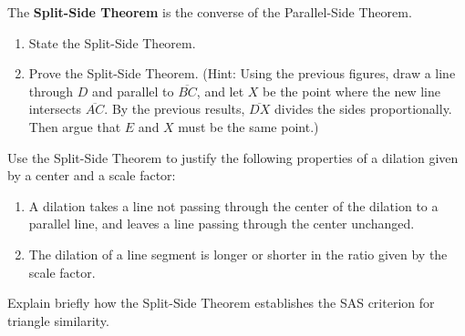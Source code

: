 \begin{prob}
The \textbf{Split-Side Theorem} is the converse of the Parallel-Side Theorem.   
\begin{enumerate}
\item State the Split-Side Theorem.   
\item Prove the Split-Side Theorem.  (Hint:  Using the previous figures, draw a line through $D$ and parallel to $\overline{BC}$, and let $X$ be the point where the new line intersects $\overline{AC}$.  By the previous results, $\overline{DX}$ divides the sides proportionally.  Then argue that $E$ and $X$ must be the same point.)  
\end{enumerate}
\end{prob}



\begin{prob}
Use the Split-Side Theorem to justify the following properties of a dilation given by a center and a scale factor:
\begin{enumerate}
\item A dilation takes a line not passing through the center of the dilation to a parallel line, and leaves a line passing through the center unchanged.
\item The dilation of a line segment is longer or shorter in the ratio given by the scale factor.
\end{enumerate}

\end{prob}

\begin{prob}
Explain briefly how the Split-Side Theorem establishes the SAS criterion for triangle similarity.  
\end{prob}

